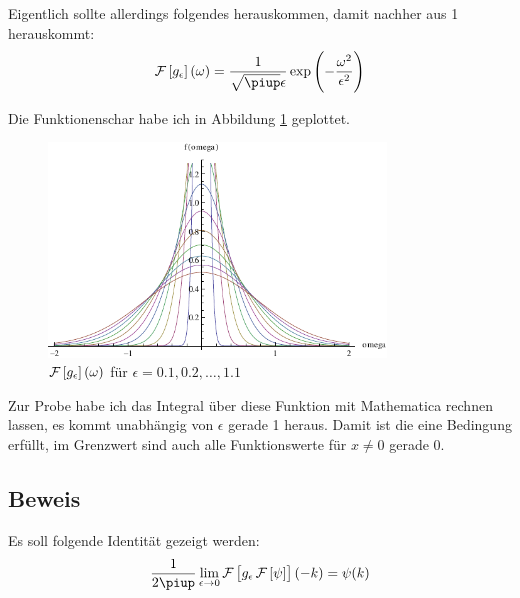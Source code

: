 Eigentlich sollte allerdings folgendes herauskommen, damit nachher aus 1 herauskommt:
\[
	\fourier\sbr{g_\epsilon}(\omega)
	= \frac{1}{\sqrt{\piup} \epsilon} \exp\del{-\frac{\omega^2}{\epsilon^2}}
\]

Die Funktionenschar habe ich in Abbildung \ref{fig:Fourier} geplottet.

\begin{figure}
	\centering
	\includegraphics[width=0.8\textwidth]{Fouriertransformierte.pdf}
	\caption{$\fourier\sbr{g_\epsilon}(\omega)$ für $\epsilon = \num{0.1}, \num{0.2}, \ldots, \num{1.1}$}
	\label{fig:Fourier}
\end{figure}

Zur Probe habe ich das Integral über diese Funktion mit Mathematica rechnen
lassen, es kommt unabhängig von $\epsilon$ gerade 1 heraus. Damit ist die eine
Bedingung erfüllt, im Grenzwert sind auch alle Funktionswerte für $x \neq 0$
gerade 0.

\subsection{Beweis}

Es soll folgende Identität gezeigt werden:
\[
	\frac1{2\piup} \lim_{\epsilon\to0} \fourier\sbr{g_\epsilon \fourier\sbr\psi}(-k)
	= \psi(k)
\]

